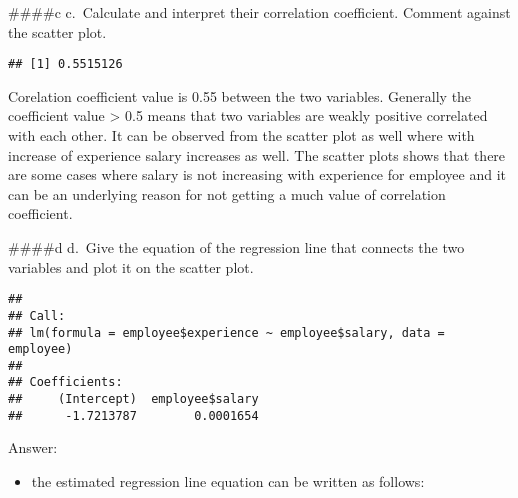 \documentclass[
]{article}
\newenvironment{Shaded}{\begin{snugshade}}{\end{snugshade}}
\newcommand{\AttributeTok}[1]{\textcolor[rgb]{0.77,0.63,0.00}{#1}}
\newcommand{\FunctionTok}[1]{\textcolor[rgb]{0.00,0.00,0.00}{#1}}
\newcommand{\NormalTok}[1]{#1}
\newcommand{\OtherTok}[1]{\textcolor[rgb]{0.56,0.35,0.01}{#1}}
\newcommand{\SpecialCharTok}[1]{\textcolor[rgb]{0.00,0.00,0.00}{#1}}
\newcommand{\StringTok}[1]{\textcolor[rgb]{0.31,0.60,0.02}{#1}}
\providecommand{\tightlist}{%
  \setlength{\itemsep}{0pt}\setlength{\parskip}{0pt}}
\begin{document}
\#\#\#\#c c.~Calculate and interpret their correlation coefficient.
Comment against the scatter plot.

\begin{Shaded}
\end{Shaded}

\begin{verbatim}
## [1] 0.5515126
\end{verbatim}

Corelation coefficient value is 0.55 between the two variables.
Generally the coefficient value \textgreater{} 0.5 means that two
variables are weakly positive correlated with each other. It can be
observed from the scatter plot as well where with increase of experience
salary increases as well. The scatter plots shows that there are some
cases where salary is not increasing with experience for employee and it
can be an underlying reason for not getting a much value of correlation
coefficient.

\#\#\#\#d d.~Give the equation of the regression line that connects the
two variables and plot it on the scatter plot.

\begin{Shaded}
\end{Shaded}

\begin{verbatim}
## 
## Call:
## lm(formula = employee$experience ~ employee$salary, data = employee)
## 
## Coefficients:
##     (Intercept)  employee$salary  
##      -1.7213787        0.0001654
\end{verbatim}

Answer:

\begin{itemize}
\tightlist
\item
  the estimated regression line equation can be written as follows:
\end{itemize}
\end{document}
